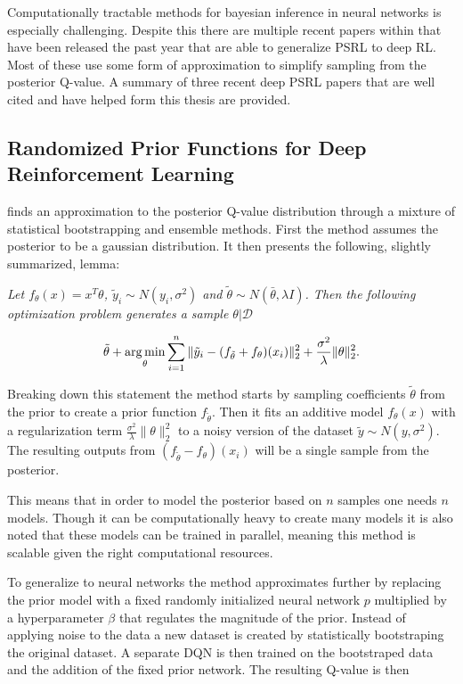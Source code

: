 Computationally tractable methods for bayesian inference in neural networks is especially challenging. Despite this there are multiple recent papers within that have been released the past year that are able to generalize PSRL to deep RL. Most of these use some form of approximation to simplify sampling from the posterior Q-value. A summary of three recent deep PSRL papers that are well cited and have helped form this thesis are provided.

\subsection{Randomized Prior Functions for Deep Reinforcement Learning}

\cite{osband_2018} finds an approximation to the posterior Q-value distribution through a mixture of statistical bootstrapping and ensemble methods. First the method assumes the posterior to be a gaussian distribution. It then presents the following, slightly summarized, lemma:

\textit{Let $f_\theta (x) = x^T\theta$, $\tilde{y}_i\sim N(y_i,\sigma^2)$ and $\tilde{\theta} \sim N(\bar{\theta}, \lambda I)$. Then the following optimization problem generates a sample $\theta | \mathcal{D}$}

\begin{equation}
    \tilde{\theta} + \operatorname*{arg\,min}_\theta \sum_{i=1}^n\|\tilde{y}_i-(f_{\tilde{\theta}} + f_\theta)(x_i)\|_2^2 + \frac{\sigma^2}{\lambda}\|\theta\|_2^2.
\end{equation}

Breaking down this statement the method starts by sampling coefficients $\tilde{\theta}$ from the prior to create a prior function $f_{\tilde{\theta}}$. Then it fits an additive model $f_\theta(x)$ with a regularization term $\frac{\sigma^2}{\lambda}\|\theta\|_2^2$ to a noisy version of the dataset $\tilde{y} \sim N(y, \sigma^2)$. The resulting outputs from $(f_{\tilde{\theta}}-f_{\theta})(x_i)$ will be a single sample from the posterior. 

This means that in order to model the posterior based on $n$ samples one needs $n$ models. Though it can be computationally heavy to create many models it is also noted that these models can be trained in parallel, meaning this method is scalable given the right computational resources.

To generalize to neural networks the method approximates further by replacing the prior model with a fixed randomly initialized neural network $p$ multiplied by a hyperparameter $\beta$ that regulates the magnitude of the prior. Instead of applying noise to the data a new dataset is created by statistically bootstraping the original dataset. A separate DQN is then trained on the bootstraped data and the addition of the fixed prior network. The resulting Q-value is then 

